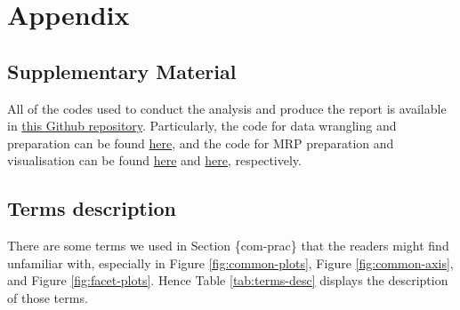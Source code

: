 \documentclass{monashthesis}
\begin{document}
\appendix

\hypertarget{appendix}{%
\chapter{Appendix}\label{appendix}}

\hypertarget{supplementary-material}{%
\section{Supplementary Material}\label{supplementary-material}}

All of the codes used to conduct the analysis and produce the report is available in \href{https://github.com/Dewi-Amaliah/MRP_diagnostic_plot}{this Github repository}. Particularly, the code for data wrangling and preparation can be found \href{https://github.com/Dewi-Amaliah/MRP_diagnostic_plot/blob/main/case_study/analysis/cces_acs_wrangling.Rmd}{here}, and the code for MRP preparation and visualisation can be found \href{https://github.com/Dewi-Amaliah/MRP_diagnostic_plot/blob/main/case_study/analysis/mrp_fitting.R}{here} and \href{https://github.com/Dewi-Amaliah/MRP_diagnostic_plot/blob/main/case_study/analysis/mrp_vis.R}{here}, respectively.

\hypertarget{terms}{%
\section{Terms description}\label{terms}}

There are some terms we used in Section \{com-prac\} that the readers might find unfamiliar with, especially in Figure \ref{fig:common-plots}, Figure \ref{fig:common-axis}, and Figure \ref{fig:facet-plots}. Hence Table \ref{tab:terms-desc} displays the description of those terms.
\end{document}
